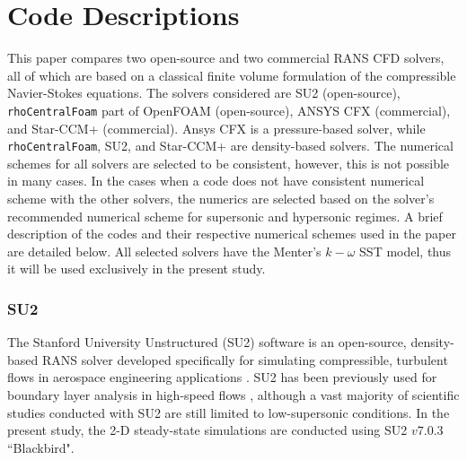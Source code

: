 \documentclass[journal ]{new-aiaa}
\begin{document}
\section{Code Descriptions}
This paper compares two open-source and two commercial RANS CFD solvers, all of which are based on a classical finite volume formulation of the compressible Navier-Stokes equations. The solvers considered are SU2 (open-source), \texttt{rhoCentralFoam} part of OpenFOAM (open-source), ANSYS CFX (commercial), and Star-CCM+ (commercial). Ansys CFX is a pressure-based solver, while \texttt{rhoCentralFoam}, SU2, and Star-CCM+ are density-based solvers. The numerical schemes for all solvers are selected to be consistent, however, this is not possible in many cases. In the cases when a code does not have consistent numerical scheme with the other solvers, the numerics are selected based on the solver's recommended numerical scheme for supersonic and hypersonic regimes. A brief description of the codes and their respective numerical schemes used in the paper are detailed below. All selected solvers have the Menter's $k-\omega$ SST model, thus it will be used exclusively in the present study.



\subsubsection{SU2}
The Stanford University Unstructured (SU2) software is an open-source, density-based RANS solver developed specifically for simulating compressible, turbulent flows in  aerospace engineering applications \cite{SU2}. %
SU2 has been previously used for boundary layer analysis in high-speed flows \cite{Hoste2017, VanOostrom2015, Hall2019}, although a vast majority of scientific studies conducted with SU2 are still limited to low-supersonic conditions. In the present study, the 2-D steady-state simulations are conducted using SU2 $v7.0.3$ ``Blackbird".
\end{document}
